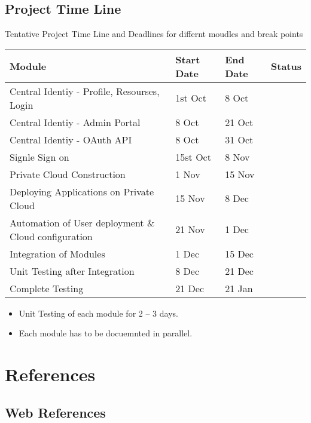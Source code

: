 \documentclass[12pt]{report}
\begin{document}
\pagebreak
\section{Project Time Line}

	Tentative Project Time Line and Deadlines for differnt moudles and break points
	
	\begin{table}[H]
		
		\begin{tabular}{ | l | l | l | l |}
			\hline 
			\textbf{Module} & \textbf{Start Date} & \textbf{End Date} & \textbf{Status} \\
			\hline 
			Central Identiy - Profile, Resourses, Login  & 1st Oct & 8 Oct & \\
			\hline
			Central Identiy - Admin Portal & 8 Oct & 21 Oct & \\
			\hline
			Central Identiy - OAuth API & 8 Oct & 31 Oct & \\
			\hline
			Signle Sign on & 15st Oct & 8 Nov & \\
			\hline
			Private Cloud Construction & 1 Nov & 15 Nov  & \\
			\hline 
			Deploying Applications on Private Cloud & 15 Nov & 8 Dec & \\
			\hline 
			Automation of User deployment \& Cloud configuration & 21 Nov & 1 Dec & \\
			\hline 
			Integration of Modules & 1 Dec & 15 Dec & \\
			\hline
			Unit Testing after Integration & 8 Dec & 21 Dec  & \\
			\hline
			Complete Testing & 21 Dec & 21 Jan &  \\
				
			\hline 
		\end{tabular}
		
	\end{table}
	
	\begin{itemize}
		\item Unit Testing of each module for 2 -- 3 days.
		\item Each module has to be docuemnted in parallel.
	\end{itemize}
	
\chapter{References}

\section{Web References}
\end{document}
